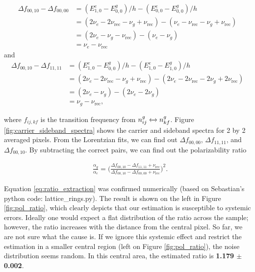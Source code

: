 			\begin{align*}
				\Delta f_{00,10}-\Delta f_{00,00}&=(E^{e}_{1,0}-E^{g}_{0,0})/h-(E^{e}_{0,0}-E^{g}_{0,0})/h \\
				&=(2\nu_e-2\nu_{\text{rec}}-\nu_g+\nu_{\text{rec}})-(\nu_e-\nu_{\text{rec}}-\nu_g+\nu_{\text{rec}}) \\		
				&=(2\nu_e-\nu_g-\nu_{\text{rec}})-(\nu_e-\nu_g) \\	
				&=\nu_e-\nu_{\text{rec}}
			\end{align*}
		and
			\begin{align*}
				\Delta f_{00,10}-\Delta f_{11,11}&=(E^{e}_{1,0}-E^{g}_{0,0})/h-(E^{e}_{1,0}-E^{g}_{1,0})/h \\
				&=(2\nu_e-2\nu_{\text{rec}}-\nu_g+\nu_{\text{rec}})-(2\nu_e-2\nu_{\text{rec}}-2\nu_g+2\nu_{\text{rec}}) \\		
				&=(2\nu_e-\nu_g)-(2\nu_e-2\nu_g) \\	
				&=\nu_g-\nu_{\text{rec}},
			\end{align*}

		\noindent where $f_{ij,kf}$ is the transition frequency from $n^{g}_{ij}\xleftrightarrow{} n^{g}_{kf}$.
		Figure \ref{fig:carrier_sideband_spectra} shows the carrier and sideband spectra for 2 by 2 averaged pixels. From the Lorentzian fits, we can find out $\Delta f_{00,00}$, $\Delta f_{11,11}$, and $\Delta f_{00,10}$. By subtracting the correct pairs, we can find out the polarizability ratio

		\begin{align}
			&\frac{\alpha_g}{\alpha_e}=\bigg(\frac{\Delta f_{00,10}-\Delta f_{11,11}+\nu_{\text{rec}}}{\Delta f_{00,10}-\Delta f_{00,00}+\nu_{\text{rec}}}\bigg)^{2}.
			\label{eq:ratio_extraction}
		\end{align}

		 \noindent Equation \ref{eq:ratio_extraction} was confirmed numerically (based on Sebastian's python code: lattice\_rings.py). The result is shown on the left in Figure \ref{fig:pol_ratio}, which clearly depicts that our estimation is susceptible to systemic errors. Ideally one would expect a flat distribution of the ratio across the sample; however, the ratio increases with the distance from the central pixel. So far, we are not sure what the cause is. If we ignore this systemic effect and restrict the estimation in a smaller central region (left on Figure \ref{fig:pol_ratio}), the noise distribution seems random. In this central area, the estimated ratio is \textbf{1.179 $\pmb{\pm}$ 0.002}. 

